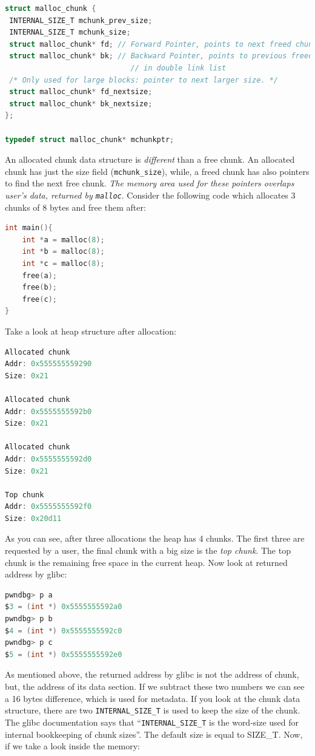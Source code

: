 \documentclass{masterthesis}
\newcommand*\sizet{SIZE\_T}
\newcommand*\libc{glibc}
\newcommand*\mallocc{\lstinline{malloc}}
\newcommand{\glnote}[1]{\todo[color=yellow!20]{#1}}
\begin{document}
\begin{lstlisting}[language=c,frame=single]
struct malloc_chunk {
 INTERNAL_SIZE_T mchunk_prev_size;
 INTERNAL_SIZE_T mchunk_size;
 struct malloc_chunk* fd; // Forward Pointer, points to next freed chunk
 struct malloc_chunk* bk; // Backward Pointer, points to previous freed chunk
                             // in double link list
 /* Only used for large blocks: pointer to next larger size. */
 struct malloc_chunk* fd_nextsize;
 struct malloc_chunk* bk_nextsize;
};

typedef struct malloc_chunk* mchunkptr;
\end{lstlisting}

An allocated chunk data structure is \emph{different} than a free chunk. An allocated chunk has just the size field (\lstinline{mchunk_size}), while, a freed chunk has also pointers to find the next free chunk.
\emph{The memory area used for these pointers overlaps user's data, returned by \mallocc{}}.
Consider the following code which allocates 3 chunks of 8 bytes and free them after:

\begin{lstlisting}[language=c,frame=tlrb]
int main(){
	int *a = malloc(8);
	int *b = malloc(8);
	int *c = malloc(8);
	free(a);
	free(b);
	free(c);
}
\end{lstlisting}

Take a look at heap structure after allocation:

\begin{lstlisting}[language=c,frame=tlrb]
Allocated chunk
Addr: 0x555555559290
Size: 0x21

Allocated chunk
Addr: 0x5555555592b0
Size: 0x21

Allocated chunk
Addr: 0x5555555592d0
Size: 0x21

Top chunk
Addr: 0x5555555592f0
Size: 0x20d11
\end{lstlisting}

As you can see, after three allocations the heap has 4 chunks. The first three are requested by a user, the final chunk with a big size is the \emph{top chunk}. The top chunk is the remaining free space in the current heap. Now look at returned address by \libc{}:

\begin{lstlisting}[language=c,frame=tlrb]
pwndbg> p a
$3 = (int *) 0x5555555592a0
pwndbg> p b
$4 = (int *) 0x5555555592c0
pwndbg> p c
$5 = (int *) 0x5555555592e0
\end{lstlisting}

As mentioned above, the returned address by \libc{} is not the address of chunk, but, the address of its data section. If we subtract these two numbers we can see a 16 bytes difference, which is used for metadata. If you look at the chunk data structure, there are two \lstinline{INTERNAL_SIZE_T} is used to keep the size of the chunk. The \libc{} documentation says that ``\lstinline{INTERNAL_SIZE_T} is the word-size used for internal bookkeeping of chunk sizes''. The default size is equal to \sizet{}. Now, if we take a look inside the memory:\glnote{replace with 64-bit word dump}
\end{document}
